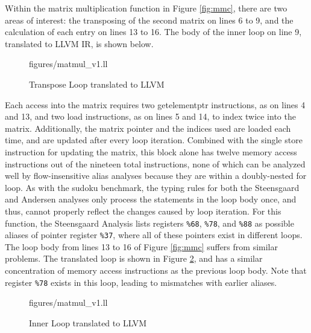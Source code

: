 Within the matrix multiplication function in Figure \ref{fig:mmc}, there are two areas of interest: the transposing of the second matrix on lines 6 to 9, and the calculation of each entry on lines 13 to 16. The body of the inner loop on line 9, translated to LLVM IR, is shown below.

\begin{figure} [h]
   {figures/matmul_v1.ll}
  \caption{Transpose Loop translated to LLVM}
  \label{fig:mmll}
\end{figure}

Each access into the matrix requires two getelementptr instructions, as on lines 4 and 13, and two load instructions, as on lines 5 and 14, to index twice into the matrix. Additionally, the matrix pointer and the indices used are loaded each time, and are updated after every loop iteration. Combined with the single store instruction for updating the matrix, this block alone has twelve memory access instructions out of the nineteen total instructions, none of which can be analyzed well by flow-insensitive alias analyses because they are within a doubly-nested for loop. As with the sudoku benchmark, the typing rules for both the Steensgaard and Andersen analyses only process the statements in the loop body once, and thus, cannot properly reflect the changes caused by loop iteration. For this function, the Steensgaard Analysis lists registers \texttt{\%68}, \texttt{\%78}, and \texttt{\%88} as possible aliases of pointer register \texttt{\%37}, where all of these pointers exist in different loops. The loop body from lines 13 to 16 of Figure \ref{fig:mmc} suffers from similar problems. The translated loop is shown in Figure \ref{fig:mmll2}, and has a similar concentration of memory access instructions as the previous loop body. Note that register \texttt{\%78} exists in this loop, leading to mismatches with earlier aliases.

\begin{figure} [h]
   {figures/matmul_v1.ll}
  \caption{Inner Loop translated to LLVM}
  \label{fig:mmll2}
\end{figure}

